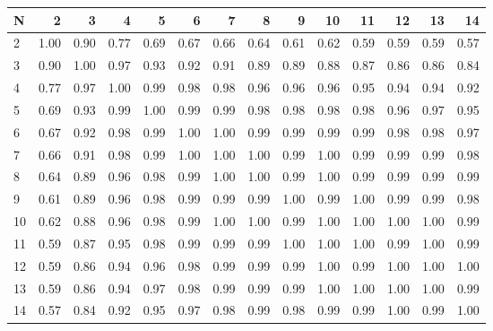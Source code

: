 \begin{tabular}{lrrrrrrrrrrrrr}
\toprule
N &    2  &    3  &    4  &    5  &    6  &    7  &    8  &    9  &    10 &    11 &    12 &    13 &    14 \\
\midrule
2  &  1.00 &  0.90 &  0.77 &  0.69 &  0.67 &  0.66 &  0.64 &  0.61 &  0.62 &  0.59 &  0.59 &  0.59 &  0.57 \\
3  &  0.90 &  1.00 &  0.97 &  0.93 &  0.92 &  0.91 &  0.89 &  0.89 &  0.88 &  0.87 &  0.86 &  0.86 &  0.84 \\
4  &  0.77 &  0.97 &  1.00 &  0.99 &  0.98 &  0.98 &  0.96 &  0.96 &  0.96 &  0.95 &  0.94 &  0.94 &  0.92 \\
5  &  0.69 &  0.93 &  0.99 &  1.00 &  0.99 &  0.99 &  0.98 &  0.98 &  0.98 &  0.98 &  0.96 &  0.97 &  0.95 \\
6  &  0.67 &  0.92 &  0.98 &  0.99 &  1.00 &  1.00 &  0.99 &  0.99 &  0.99 &  0.99 &  0.98 &  0.98 &  0.97 \\
7  &  0.66 &  0.91 &  0.98 &  0.99 &  1.00 &  1.00 &  1.00 &  0.99 &  1.00 &  0.99 &  0.99 &  0.99 &  0.98 \\
8  &  0.64 &  0.89 &  0.96 &  0.98 &  0.99 &  1.00 &  1.00 &  0.99 &  1.00 &  0.99 &  0.99 &  0.99 &  0.99 \\
9  &  0.61 &  0.89 &  0.96 &  0.98 &  0.99 &  0.99 &  0.99 &  1.00 &  0.99 &  1.00 &  0.99 &  0.99 &  0.98 \\
10 &  0.62 &  0.88 &  0.96 &  0.98 &  0.99 &  1.00 &  1.00 &  0.99 &  1.00 &  1.00 &  1.00 &  1.00 &  0.99 \\
11 &  0.59 &  0.87 &  0.95 &  0.98 &  0.99 &  0.99 &  0.99 &  1.00 &  1.00 &  1.00 &  0.99 &  1.00 &  0.99 \\
12 &  0.59 &  0.86 &  0.94 &  0.96 &  0.98 &  0.99 &  0.99 &  0.99 &  1.00 &  0.99 &  1.00 &  1.00 &  1.00 \\
13 &  0.59 &  0.86 &  0.94 &  0.97 &  0.98 &  0.99 &  0.99 &  0.99 &  1.00 &  1.00 &  1.00 &  1.00 &  0.99 \\
14 &  0.57 &  0.84 &  0.92 &  0.95 &  0.97 &  0.98 &  0.99 &  0.98 &  0.99 &  0.99 &  1.00 &  0.99 &  1.00 \\
\bottomrule
\end{tabular}
